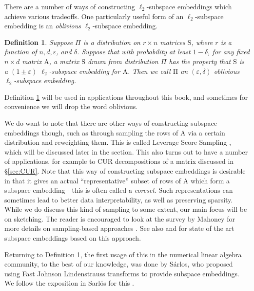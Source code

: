 \documentclass[11pt]{article}
\newtheorem{definition}[theorem]{Definition}
\newcommand{\mat}[1]{{\ensuremath{\bm{\mathrm{#1}}}}}
\def\matA{\mat{A}}
\def\matS{\mat{S}}
\newcommand{\eps}{\varepsilon}
\begin{document}
There are a number of ways of constructing $\ell_2$-subspace embeddings which achieve various tradeoffs. 
One particularly useful form of an $\ell_2$-subspace embedding is an {\it oblivious} $\ell_2$-subspace 
embedding.

\begin{definition}\label{def:oblSubspace}
Suppose $\Pi$ is a distribution on $r \times n$ matrices $\matS$, where $r$
is a function of $n, d, \eps$, and $\delta$. 
Suppose that with probability at least $1-\delta$, for any fixed $n \times d$ matrix $\matA$,
a matrix $\matS$ drawn from 
distribution $\Pi$ has the property
that $\matS$ is a 
$(1\pm \eps)$ $\ell_2$-subspace embedding for $\matA$. Then
we call $\mat\Pi$ an $(\eps, \delta)$ oblivious $\ell_2$-subspace embedding. 
\end{definition}

Definition \ref{def:oblSubspace} 
will be used in applications throughout this book, and sometimes for convenience
we will drop the word oblivious. 

We do want to note that there are other ways of constructing subspace embeddings
though, such as through sampling the rows of $\matA$ via a certain distribution and reweighting them. 
This is called Leverage Score Sampling \cite{DMM06a,DMM061,DMM062,DMMS07},
which will be discussed later in the section. This also turns out to have a number of applications, for example
to CUR decompositions of a matrix discussed in \S\ref{sec:CUR}. Note that this way of constructing subspace
embeddings is desirable in that it gives an actual ``representative'' subset of rows of $\matA$ which form
a subspace embedding - this is often called a {\it coreset}. Such representations can sometimes lead to better
data interpretability, as well as preserving sparsity. While we do discuss this kind of sampling to some
extent, our main focus will be on sketching. The reader is encouraged to look at the survey by Mahoney
for more details on sampling-based approaches \cite{m11}. See also \cite{lmp13} and \cite{clmmps14} for 
state of the art subspace embeddings based on this approach. 

Returning to Definition \ref{def:oblSubspace}, the first usage of this in the numerical linear 
algebra community,
to the best of our knowledge, was done by S\'arlos, who proposed using Fast Johnson Lindenstrauss transforms
to provide subspace embeddings. We follow the exposition in Sarl\'{o}s for this \cite{S06}.
\end{document}
